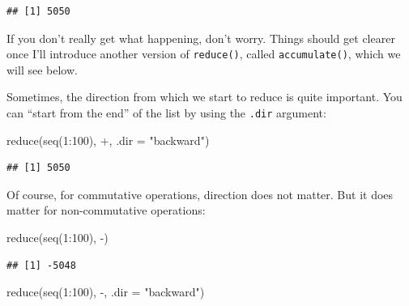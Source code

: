 \documentclass[
]{article}
\newenvironment{Shaded}{\begin{snugshade}}{\end{snugshade}}
\newcommand{\AttributeTok}[1]{\textcolor[rgb]{0.77,0.63,0.00}{#1}}
\newcommand{\DecValTok}[1]{\textcolor[rgb]{0.00,0.00,0.81}{#1}}
\newcommand{\FunctionTok}[1]{\textcolor[rgb]{0.00,0.00,0.00}{#1}}
\newcommand{\NormalTok}[1]{#1}
\newcommand{\SpecialCharTok}[1]{\textcolor[rgb]{0.00,0.00,0.00}{#1}}
\newcommand{\StringTok}[1]{\textcolor[rgb]{0.31,0.60,0.02}{#1}}
\begin{document}
\begin{verbatim}
## [1] 5050
\end{verbatim}

If you don't really get what happening, don't worry. Things should get clearer once I'll introduce
another version of \texttt{reduce()}, called \texttt{accumulate()}, which we will see below.

Sometimes, the direction from which we start to reduce is quite important. You can ``start from the
end'' of the list by using the \texttt{.dir} argument:

\begin{Shaded}
\begin{Highlighting}[]
\FunctionTok{reduce}\NormalTok{(}\FunctionTok{seq}\NormalTok{(}\DecValTok{1}\SpecialCharTok{:}\DecValTok{100}\NormalTok{), }\StringTok{\textasciigrave{}}\AttributeTok{+}\StringTok{\textasciigrave{}}\NormalTok{, }\AttributeTok{.dir =} \StringTok{"backward"}\NormalTok{)}
\end{Highlighting}
\end{Shaded}

\begin{verbatim}
## [1] 5050
\end{verbatim}

Of course, for commutative operations, direction does not matter. But it does matter for non-commutative
operations:

\begin{Shaded}
\begin{Highlighting}[]
\FunctionTok{reduce}\NormalTok{(}\FunctionTok{seq}\NormalTok{(}\DecValTok{1}\SpecialCharTok{:}\DecValTok{100}\NormalTok{), }\StringTok{\textasciigrave{}}\AttributeTok{{-}}\StringTok{\textasciigrave{}}\NormalTok{)}
\end{Highlighting}
\end{Shaded}

\begin{verbatim}
## [1] -5048
\end{verbatim}

\begin{Shaded}
\begin{Highlighting}[]
\FunctionTok{reduce}\NormalTok{(}\FunctionTok{seq}\NormalTok{(}\DecValTok{1}\SpecialCharTok{:}\DecValTok{100}\NormalTok{), }\StringTok{\textasciigrave{}}\AttributeTok{{-}}\StringTok{\textasciigrave{}}\NormalTok{, }\AttributeTok{.dir =} \StringTok{"backward"}\NormalTok{)}
\end{Highlighting}
\end{Shaded}
\end{document}
